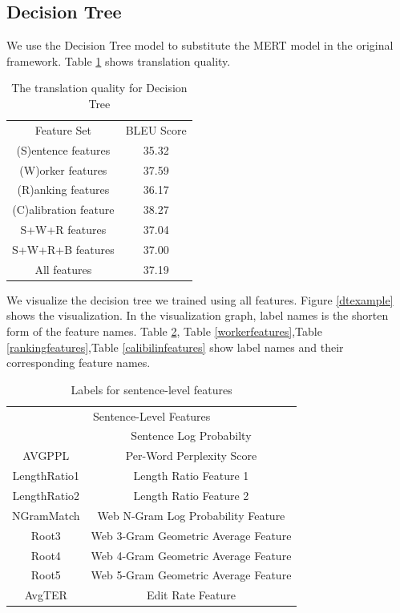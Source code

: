 \subsection{Decision Tree}
We use the Decision Tree model to substitute the MERT model in the original framework. 
 Table \ref{dtbleu} shows translation quality. 
\begin{table}[h]
\center
\begin{tabular}{c|c}
\hline
Feature Set           & BLEU Score \\ \hhline{==}
(S)entence features   & 35.32      \\ \hline
(W)orker features     & 37.59      \\ \hline
(R)anking features    & 36.17     \\ \hline
(C)alibration feature & 38.27      \\ \hline
S+W+R features        & 37.04     \\ \hline
S+W+R+B features      & 37.00    \\ \hline
All features          & 37.19     \\ \hline
\end{tabular}
\caption{The translation quality for Decision Tree}
\label{dtbleu}
\end{table}
We visualize the decision tree we trained using all features. Figure \ref{dtexample} shows the visualization. In the visualization graph, label names is the shorten form of the feature names.
Table \ref{senfeatures}, Table \ref{workerfeatures},Table \ref{rankingfeatures},Table \ref{calibilinfeatures} show label names and their corresponding feature names.

\begin{table}[h]
\center
\begin{tabular}{cc}
\hline
\multicolumn{2}{c}{Sentence-Level Features}                              \\  \hhline{==}
\multicolumn{1}{c|}{LOGPROB}      & Sentence Log Probabilty              \\ \hline
\multicolumn{1}{c|}{AVGPPL}       & Per-Word Perplexity Score            \\ \hline
\multicolumn{1}{c|}{LengthRatio1} & Length Ratio Feature 1               \\ \hline
\multicolumn{1}{c|}{LengthRatio2} & Length Ratio Feature 2               \\ \hline
\multicolumn{1}{c|}{NGramMatch}   & Web N-Gram Log Probability Feature   \\ \hline
\multicolumn{1}{c|}{Root3}        & Web 3-Gram Geometric Average Feature \\ \hline
\multicolumn{1}{c|}{Root4}        & Web 4-Gram Geometric Average Feature \\ \hline
\multicolumn{1}{c|}{Root5}        & Web 5-Gram Geometric Average Feature \\ \hline
\multicolumn{1}{c|}{AvgTER}       & Edit Rate Feature                    \\ \hline
\end{tabular}
\label{senfeatures}
\caption{Labels for sentence-level features}
\end{table}
 
